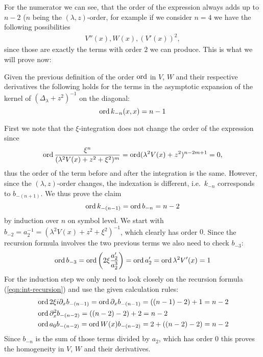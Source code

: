 For the numerator we can see, that the order of the expression always adds up to
$n-2$ ($n$ being the $(\lambda,z)$-order, for example if we consider $n=4$ we
have the following possibilities
\begin{align*}
  V''(x), W(x), (V'(x))^2,
\end{align*}
since those are exactly the terms with order $2$ we can produce. This is what we
will prove now:
\begin{MainTheorem}
  Given the previous definition of the order $\operatorname{ord}$ in $V$, $W$ and their
  respective derivatives the following holds for the terms in the asymptotic
  expansion of the kernel of $(\Delta_\lambda + z^2)^{-1}$ on the diagonal:
  \begin{equation}
    \label{eqn:ord-vs-mu-order}
    \operatorname{ord} k_{-n}(x, x) = n - 1
  \end{equation}
  \begin{Proof}
    First we note that the $\xi$-integration does not change the order of the
    expression since
    \begin{equation*}
      \operatorname{ord} \frac{\xi^n}{(\lambda^2 V(x) + z^2 + \xi^2)^m} = \operatorname{ord} (\lambda^2 V(x)
      + z^2)^{n-2m+1} = 0,
    \end{equation*}
    thus the order of the term before and after the integration is the same.
    However, since the $(\lambda,z)$-order changes, the indexation is different,
    i.e.\ $k_{-n}$ corresponds to $b_{-(n+1)}$. We
    thus prove the claim
    \begin{equation*}
      \operatorname{ord} k_{-(n-1)} = \operatorname{ord} b_{-n} = n - 2
    \end{equation*}
    by induction over $n$ on symbol level. We start with $b_{-2} = a_2^{-1} =
    (\lambda^2 V(x) + z^2 + \xi^2)^{-1}$, which clearly has order $0$. Since the
    recursion formula involves the two previous terms we also need to check
    $b_{-3}$:
    \begin{equation*}
      \operatorname{ord} b_{-3} = \operatorname{ord}\left(2\xi \frac{a_2'}{a_2^3}\right) = \operatorname{ord} a_2' = \operatorname{ord}
      \lambda^2 V'(x) = 1
    \end{equation*}
    For the induction step we only need to look closely on the recursion formula
    (\cref{eqn:int-recursion}) and use the given calculation rules:
    \begin{align*}
      &\operatorname{ord} 2\xi i \partial_x b_{-(n-1)} = \operatorname{ord} \partial_x b_{-(n-1)} = ((n-1) - 2) +
      1 = n - 2\\
      &\operatorname{ord} \partial_x^2 b_{-(n-2)} = ((n - 2) - 2) + 2 = n - 2 \\
      &\operatorname{ord} a_0 b_{-(n-2)} = \operatorname{ord} W(x) b_{-(n-2)} = 2 + ((n-2) - 2) = n - 2
    \end{align*}
    Since $b_{-n}$ is the sum of those terms divided by $a_2$, which has order
    $0$ this proves the homogeneity in $V$, $W$ and their derivatives.
  \end{Proof}
\end{MainTheorem}
